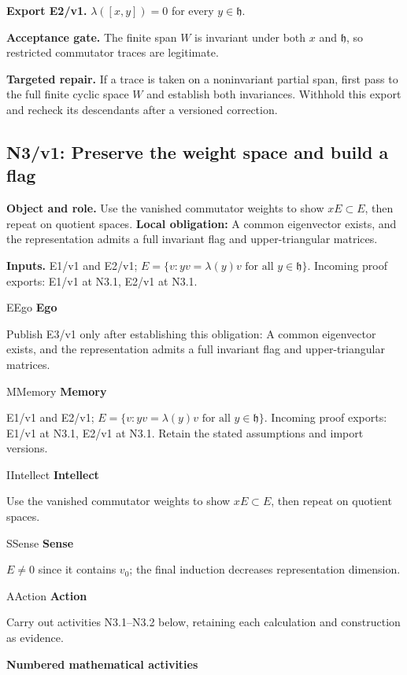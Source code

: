 \documentclass[preprint,12pt,aps,pra,showkeys,amsmath,amssymb,superscriptaddress,floatfix]{revtex4-2}
\theoremstyle{definition}
\theoremstyle{remark}
\newcommand{\mmfaculty}[3]{%
 \begin{mmfacultybox}{#1}{#2}
 {\sffamily\bfseries\color{MMBlue}#2}\par\smallskip #3
 \end{mmfacultybox}}
\newcommand{\field}[2]{\par\smallskip\noindent\textbf{#1.} #2\par}
\begin{document}
\field{Export E2/v1}{\(\lambda([x,y])=0\) for every \(y\in\mathfrak h\).}

\field{Acceptance gate}{The finite span \(W\) is invariant under both \(x\) and \(\mathfrak h\),
so restricted commutator traces are legitimate.}

\field{Targeted repair}{If a trace is taken on a noninvariant partial span, first pass to the
full finite cyclic space \(W\) and establish both invariances. Withhold
this export and recheck its descendants after a versioned correction.}

\clearpage

\subsection{N3/v1: Preserve the weight space and build a flag}

\field{Object and role}{Use the vanished commutator weights to show \(xE\subset E\), then repeat
on quotient spaces. \textbf{Local obligation:} A common eigenvector
exists, and the representation admits a full invariant flag and
upper-triangular matrices.}

\field{Inputs}{E1/v1 and E2/v1;
\(E=\{v:yv=\lambda(y)v\text{ for all }y\in\mathfrak h\}\). Incoming
proof exports: E1/v1 at N3.1, E2/v1 at N3.1.}

\mmfaculty{E}{Ego}{Publish E3/v1 only after establishing this obligation: A common
eigenvector exists, and the representation admits a full invariant flag
and upper-triangular matrices.}

\mmfaculty{M}{Memory}{E1/v1 and E2/v1;
\(E=\{v:yv=\lambda(y)v\text{ for all }y\in\mathfrak h\}\). Incoming
proof exports: E1/v1 at N3.1, E2/v1 at N3.1. Retain the stated
assumptions and import versions.}

\mmfaculty{I}{Intellect}{Use the vanished commutator weights to show \(xE\subset E\), then repeat
on quotient spaces.}

\mmfaculty{S}{Sense}{\(E\ne0\) since it contains \(v_0\); the final induction decreases
representation dimension.}

\mmfaculty{A}{Action}{Carry out activities N3.1--N3.2 below, retaining each calculation and
construction as evidence.}

\smallskip\noindent\textbf{Numbered mathematical activities}
\end{document}
